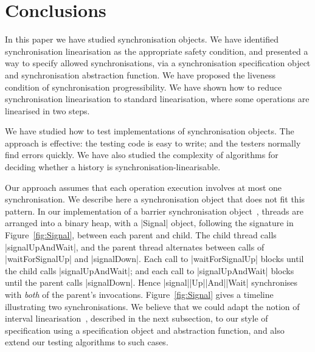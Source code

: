 \section{Conclusions}
\label{sec:conc}

In this paper we have studied synchronisation objects.  We have identified
synchronisation linearisation as the appropriate safety condition, and
presented a way to specify allowed synchronisations, via a synchronisation
specification object and synchronisation abstraction function.  We have
proposed the liveness condition of synchronisation progressibility.  We have
shown how to reduce synchronisation linearisation to standard linearisation,
where some operations are linearised in two steps.

We have studied how to test implementations of synchronisation objects.  The
approach is effective: the testing code is easy to write; and the testers
normally find errors quickly.  We have also studied the complexity of
algorithms for deciding whether a history is synchronisation-linearisable.

Our approach assumes that each operation execution involves at most one
synchronisation.  We describe here a synchronisation object that does not fit
this pattern. 
%
In our implementation of a barrier synchronisation object~\cite{SCL}, threads
are arranged into a binary heap, with a |Signal| object, following the
signature in Figure~\ref{fig:Signal}, between each parent and child.  The
child thread calls |signalUpAndWait|, and the parent thread alternates between
calls of |waitForSignalUp| and |signalDown|.  Each call to |waitForSignalUp|
blocks until the child calls |signalUpAndWait|; and each call to
|signalUpAndWait| blocks until the parent calls |signalDown|.  Hence
|signal|\-|Up|\-|And|\-|Wait| synchronises with \emph{both} of the parent's
invocations.  Figure~\ref{fig:Signal} gives a timeline illustrating two
synchronisations.  
%
We believe that we could adapt the notion of interval
linearisation~\cite{CRR-2018}, described in the next subsection, to our style
of specification using a specification object and abstraction function, and
also extend our testing algorithms to such cases.


